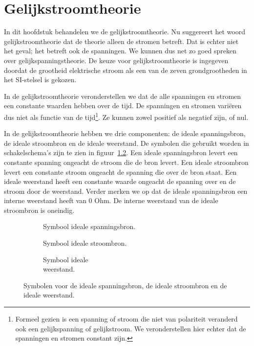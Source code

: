 \chapter{Gelijkstroomtheorie}
In dit hoofdstuk behandelen we de gelijkstroomtheorie. Nu suggereert het woord
gelijkstroomtheorie dat de theorie alleen de stromen betreft. Dat is echter niet
het geval; het betreft ook de spanningen. We kunnen dus net zo goed spreken over
gelijkspanningstheorie. De keuze voor gelijkstroomtheorie is ingegeven doordat de
grootheid elektrische stroom als een van de zeven grondgrootheden in
het SI-stelsel is gekozen.

In de gelijkstroomtheorie veronderstellen we dat de alle spanningen en stromen
een constante waarden hebben over de tijd. De spanningen en stromen vari\"eren
dus niet als functie van de tijd\footnote{Formeel gezien is een spanning of stroom
die niet van polariteit veranderd ook een gelijkspanning of gelijkstroom. We
veronderstellen hier echter dat de spanningen en stromen constant zijn.}.
 Ze kunnen zowel positief als negatief zijn,
of nul.

In de gelijkstroomtheorie hebben we drie componenten: de ideale
spanningsbron, de ideale stroombron en de ideale weerstand. De
symbolen die gebruikt worden in schakelschema's zijn te zien in
figuur~\ref{fig:symbolenbronnenenweerstand}. Een
ideale spanningsbron levert een constante spanning ongeacht de
stroom die de bron levert. Een ideale stroombron levert een
constante stroom ongeacht de spanning die over de bron staat.
Een ideale weerstand heeft een constante waarde ongeacht de
spanning over en de stroom door de weerstand. Verder merken
we op dat de ideale spanningsbron een interne weerstand heeft
van 0 Ohm. De interne weerstand van de ideale stroombron is
oneindig.

\begin{figure}[!ht]
\centering
\begin{subfigure}{0.30\textwidth}
\centering
{}
\caption{Symbool ideale spanningsbron.}
\label{fig:gelidealespanningsbron}
\end{subfigure}
\begin{subfigure}{0.30\textwidth}
\centering
{}
\caption{Symbool ideale stroombron.}
\end{subfigure}
\begin{subfigure}{0.30\textwidth}
\centering
{}
\caption{Symbool ideale\\ weerstand.}
\end{subfigure}
\caption{Symbolen voor de ideale spanningsbron, de ideale stroombron en de ideale weerstand.}
\label{fig:symbolenbronnenenweerstand}
\end{figure}

